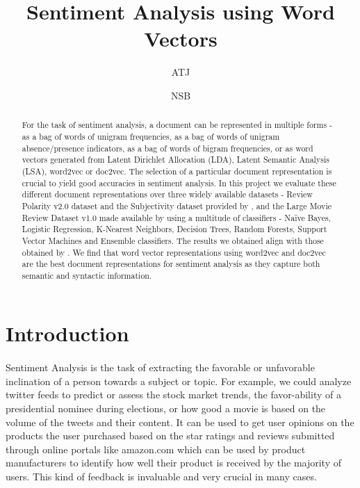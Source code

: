 \documentclass[a4paper,26pt]{article}
\title{Sentiment Analysis using Word Vectors}
\author{ATJ}
\author{NSB}
\affil{University of Massachusetts, Amherst}
\date{}
\begin{document}
\maketitle



\begin{abstract}
For the task of sentiment analysis, a document can be represented in multiple forms - as a bag of words of unigram frequencies, as a bag of words of unigram absence/presence indicators, as a bag of words of bigram frequencies, or as word vectors generated from Latent Dirichlet Allocation (LDA), Latent Semantic Analysis (LSA), word2vec or doc2vec. The selection of a particular document representation is crucial to yield good accuracies in sentiment analysis. In this project we evaluate these different document representations over three widely available datasets - Review Polarity v2.0 dataset and the Subjectivity dataset provided by \cite{pang2004sentimental}, and the Large Movie Review Dataset v1.0 made available by \cite{maas2011learning} using a multitude of classifiers - Na\"{i}ve Bayes, Logistic Regression, K-Nearest Neighbors, Decision Trees, Random Forests, Support Vector Machines and Ensemble classifiers. The results we obtained align with those obtained by \cite{maas2011learning}. We find that word vector representations using word2vec and doc2vec are the best document representations for sentiment analysis as they capture both semantic and syntactic information. 

\end{abstract}

\section{Introduction}

\paragraph{}
Sentiment Analysis is the task of extracting the favorable or unfavorable inclination of a person towards a subject or topic. For example, we could analyze twitter feeds to predict or assess the stock market trends, the favor-ability of a presidential nominee during elections, or how good a movie is based on the volume of the tweets and their content. It can be used to get user opinions on the products the user purchased based on the star ratings and reviews submitted through online portals like amazon.com which can be used by product manufacturers to identify how well their product is received by the majority of users. This kind of feedback is invaluable and very crucial in many cases.
\end{document}
